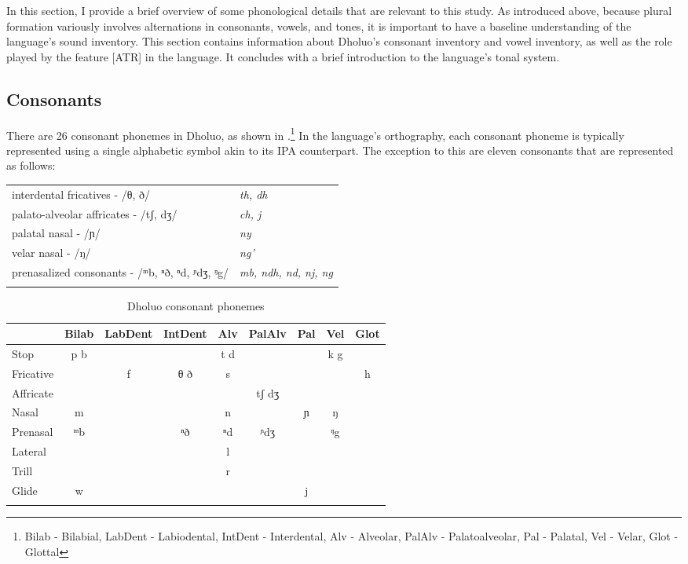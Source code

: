 \documentclass[output=paper,colorlinks,citecolor=brown]{langscibook}
\begin{document}
In this section, I provide a brief overview of some phonological details that are relevant to this study. As introduced above, because plural formation variously involves alternations in consonants, vowels, and tones, it is important to have a baseline understanding of the language's sound inventory. This section contains information about Dholuo's consonant inventory and vowel inventory, as well as the role played by the feature [ATR] in the language. It concludes with a brief introduction to the language's tonal system. 

\subsection{Consonants}
There are 26 consonant phonemes in Dholuo, as shown in .\footnote{Bilab - Bilabial, LabDent - Labiodental, IntDent - Interdental, Alv - Alveolar, PalAlv - Palatoalveolar, Pal - Palatal, Vel - Velar, Glot - Glottal} In the language's orthography, each consonant phoneme is typically represented using a single alphabetic symbol akin to its IPA counterpart. The exception to this are eleven consonants that are represented as follows:\\

\begin{tabularx}{.50\textwidth}{ll}
interdental fricatives - /θ, ð/ & \textit{th, dh}\\
palato-alveolar affricates - /tʃ, dʒ/ & \textit{ch, j} \\
palatal nasal - /ɲ/ & \textit{ny} \\
velar nasal - /ŋ/ & \textit{ng'} \\
prenasalized consonants - /ᵐb, ⁿð, ⁿd, ᶮdʒ, ᵑg/ & \textit{mb, ndh, nd, nj, ng}\\ \\
\end{tabularx}
 \begin{table}
\caption{Dholuo consonant phonemes}
\label{tab:CPhonemes}
 \begin{tabular}{lcccccccc}
  \lsptoprule
& Bilab & LabDent & IntDent & Alv & PalAlv & Pal & Vel & Glot \\
\midrule
 Stop & p b &  &  & t d &  &  &  k g & \\
 Fricative & & f & θ ð & s &  &    &  & h \\
 Affricate & &&& & tʃ dʒ &&& \\
 Nasal & m &&& n && ɲ & ŋ & \\
 Prenasal & ᵐb && ⁿð & ⁿd & ᶮdʒ && ᵑg & \\
 Lateral &&&&l &&&& \\
 Trill &&&&r &&&& \\
 Glide & w&&& &&j&& \\
  \lspbottomrule
 \end{tabular}
\end{table}   
\end{document}
